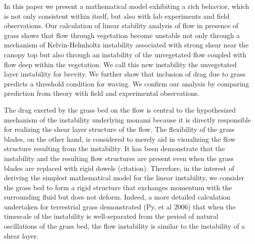 \documentclass[aps,prl,twocolumn,showpacs,superscriptaddress,groupedaddress,10pt]{revtex4-1}  %
\begin{document}
In this paper we present a mathematical model exhibiting a rich behavior, which is not only consistent within itself, but also with lab experiments and field observations. Our calculation of linear stability analysis of flow in presence of grass shows that flow through vegetation become unstable not only through a mechanism of Kelvin-Helmholtz instability associated with strong shear near the canopy top but also through an instability of the unvegetated flow coupled with flow deep within the vegetation. We call this new instability the unvegetated layer instability for brevity. We further show that inclusion of drag due to grass predicts a threshold condition for waving. We confirm our analysis by comparing prediction from theory with field and experimental observations.

The drag exerted by the grass bed on the flow is central to the hypothesized mechanism\cite{Ghisal02} of the instability underlying monami because it is directly responsible for realizing the shear layer structure of the flow. The flexibility of the grass blades, on the other hand, is considered to merely aid in visualizing the flow structure resulting from the instability. It has been demonstrate that the instability and the resulting flow structures are present even when the grass blades are replaced with rigid dowels (citation). Therefore, in the interest of deriving the simplest mathematical model for the linear instability, we consider the grass bed to form a rigid structure that exchanges momentum with the surrounding fluid but does not deform. Indeed, a more detailed calculation undertaken for terrestrial grass demonstrated (Py, et al 2006) that when the timescale of the instability is well-separated from the period of natural oscillations of the grass bed, the flow instability is similar to the 
instability of a shear layer. 
\end{document}
